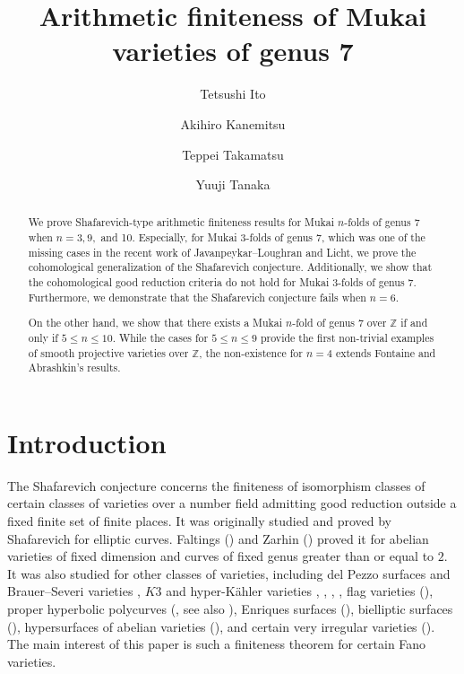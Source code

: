 \documentclass[autodetect-engine, a4paper]{amsart}
\title[Arithmetic finiteness of Mukai varieties of genus 7]{Arithmetic finiteness of Mukai varieties of genus 7}
\author{Tetsushi Ito}
\author{Akihiro Kanemitsu}
\author{Teppei Takamatsu}
\author{Yuuji Tanaka}
\theoremstyle{definition}
\begin{document}


\begin{abstract}
We prove Shafarevich-type arithmetic finiteness results for Mukai $n$-folds of genus 7 when $n=3,9,$ and 10. Especially, for Mukai 3-folds of genus 7, which was one of the missing cases in the recent work of Javanpeykar--Loughran and Licht, we prove the cohomological generalization of the Shafarevich conjecture. Additionally, we show that the cohomological good reduction criteria do not hold for Mukai 3-folds of genus 7. Furthermore, we demonstrate that the Shafarevich conjecture fails when $n=6$.

On the other hand, we show that there exists a Mukai $n$-fold of genus 7 over $\mathbb{Z}$ if and only if $5\leq n \leq 10$. 
While the cases for $5 \leq n \leq 9$ provide the first non-trivial examples of smooth projective varieties over $\mathbb{Z}$, 
the non-existence for $n=4$ extends Fontaine and Abrashkin's results.
\end{abstract}


\maketitle

\tableofcontents

\section{Introduction}

The Shafarevich conjecture concerns the finiteness of isomorphism classes of certain classes of varieties over a number field admitting good reduction outside a fixed finite set of finite places.
It was originally studied and proved by Shafarevich for elliptic curves.
Faltings (\cite{FaltingsShaf}) and Zarhin (\cite{Zarhin}) proved it for abelian varieties of fixed dimension and curves of fixed genus greater than or equal to $2$.
It was also studied for other classes of varieties,
including del Pezzo surfaces and Brauer--Severi varieties \cite{Scholl}, $K3$ and hyper-K\"ahler varieties
\cite{Andre}, \cite{She}, \cite{Takamatsu}, \cite{Fu-Li-Takamatsu-Zou}, flag varieties (\cite{Javanpeykar-Loughran:flag}), proper hyperbolic polycurves (\cite{Nagamachi-Takamatsu}, see also \cite{Javanpeykarcanonicallypolarized}), Enriques surfaces (\cite{TakamatsuEnriques}), bielliptic surfaces (\cite{Takamatsubielliptic}),
hypersurfaces of abelian varieties (\cite{Lawrence-Sawin}),
and certain very irregular varieties (\cite{Kramer-Maculan}).
The main interest of this paper is such a finiteness theorem for certain Fano varieties.
\end{document}
